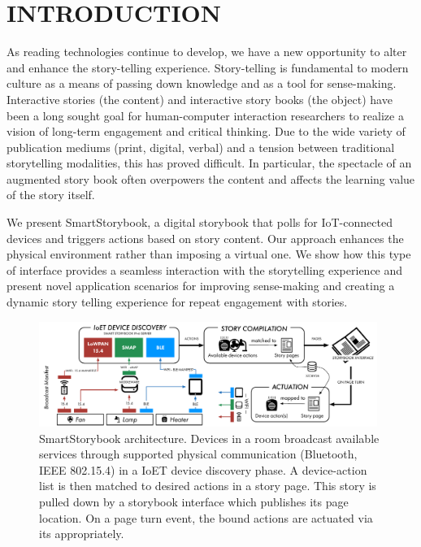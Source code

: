 \documentclass{sigchi}
\newcommand\name{SmartStorybook}
\newcommand\namesp{SmartStorybook }
\begin{document}




\newpage
\section{INTRODUCTION}
As reading technologies continue to develop, we have a new opportunity to alter and enhance the story-telling experience. Story-telling is fundamental to modern culture as a means of passing down knowledge and as a tool for sense-making. Interactive stories (the content) and interactive story books (the object) have been a long sought goal for human-computer interaction researchers to realize a vision of long-term engagement and critical thinking. Due to the wide variety of publication mediums (print, digital, verbal) and a tension between traditional storytelling modalities, this has proved difficult. In particular, the spectacle of an augmented story book often overpowers the content and affects the learning value of the story itself. 

We present \name, a digital storybook that polls for IoT-connected devices and triggers actions based on story content. Our approach enhances the physical environment rather than imposing a virtual one. We show how this type of interface provides a seamless interaction with the storytelling experience and present novel application scenarios for improving sense-making and creating a dynamic story telling experience for repeat engagement with stories. 
   


  \begin{figure}[th!]
      \centering
      \includegraphics[keepaspectratio, width=0.98\textwidth]{figures/architecture.pdf} 
      \caption{\namesp architecture. Devices in a room broadcast available services through supported physical communication (Bluetooth, IEEE 802.15.4) in a IoET device discovery phase. A device-action list is then matched to desired actions in a story page. This story is pulled down by a storybook interface which publishes its page location. On a page turn event, the bound actions are actuated via its appropriately. }
      \vspace{-4pt}
      \label{fig:architecture} 
    \end{figure}
\end{document}
